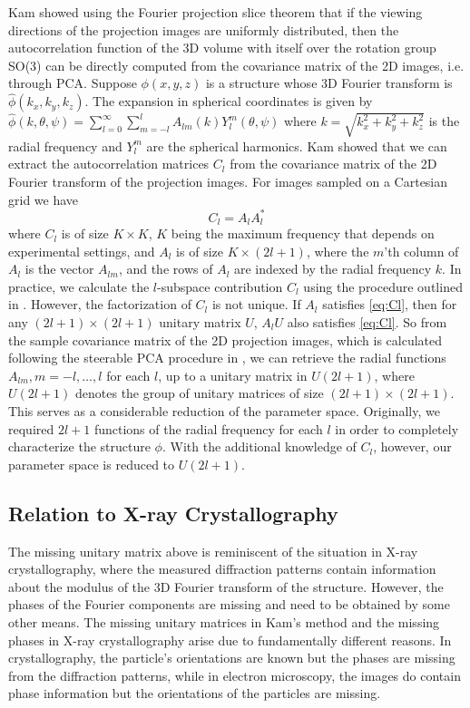 \documentclass{article}
\begin{document}
Kam showed \cite{kam1980} using the Fourier projection slice theorem that if the viewing
directions of the projection images are uniformly distributed, then the
autocorrelation function of the 3D volume with itself over the rotation group
SO(3) can be directly computed from the
covariance matrix of the 2D images, i.e. through PCA. Suppose
$\phi(x, y, z)$ is a structure whose 3D Fourier
transform is $\hat \phi(k_x, k_y, k_z)$. The expansion in spherical coordinates is given
by
$\hat{\phi}(k,\theta,\psi) = \sum_{l=0}^{\infty} \sum_{m=-l}^{l} A_{lm}(k) Y_l^m
(\theta, \psi)
$
where $k=\sqrt{k_x^2 + k_y^2 + k_z^2} $ is the radial frequency and $Y_l^m$ are the spherical
harmonics. Kam showed
that we can extract the autocorrelation matrices
$C_l$ from the covariance matrix of the 2D Fourier transform of the projection images. For images sampled on a Cartesian grid
we have
\begin{equation}
C_l=A_l A_l^* \label{eq:Cl}
\end{equation}
where $C_l$ is of size $K \times K$, $K$ being the maximum frequency that
depends on experimental settings, and $A_l$ is of size
$K \times (2l+1)$, where the $m$'th column of $A_l$ is the vector $A_{lm}$, and the rows of $A_l$ are indexed by the radial frequency $k$. In practice, we calculate the $l$-subspace
contribution $C_l$ using the procedure outlined in \cite{kam1980}. However, the
factorization of $C_l$ is not unique. If
$A_l$ satisfies \eqref{eq:Cl}, then for any $(2l+1) \times (2l+1)$ unitary matrix
$U$, $A_lU$ also satisfies \eqref{eq:Cl}. So from the sample covariance matrix of the 2D projection images, which is calculated
following the steerable PCA procedure in \cite{Zhao1},
we can retrieve the radial functions $A_{lm}, m=-l, \ldots, l$ for each $l$,
up to a unitary matrix in $U(2l+1)$, where $U(2l+1)$ denotes the group of
unitary matrices of size $(2l+1) \times (2l+1)$. This serves as a considerable reduction of the parameter space. Originally, we required $2l+1$ functions of
the radial frequency for each $l$ in order
to completely characterize the structure $\phi$. With the additional knowledge of
$C_l$, however, our parameter space is reduced
to $U(2l+1)$.
\subsection{Relation to X-ray Crystallography}
The missing unitary matrix above is reminiscent of the situation in X-ray crystallography, where the measured diffraction patterns contain information about the modulus of the 3D
Fourier transform of the structure. However, the phases of the Fourier
components are missing and need to be obtained by some other means. The missing unitary
matrices in Kam's method and the missing phases in X-ray crystallography arise due to
fundamentally different reasons. In crystallography,
the particle's orientations are known but
the phases are missing from the diffraction patterns, while in electron
microscopy, the images do contain phase information but the orientations of the
particles are missing.
\end{document}
